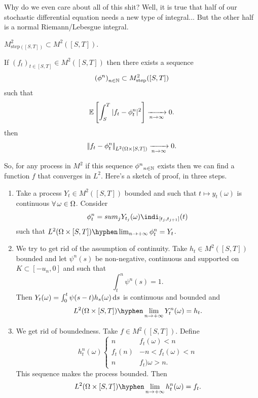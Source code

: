 \documentclass[crop=false, class=article]{standalone}
\begin{document}
Why do we even care about all of this shit? Well, it is true that half of our stochastic differential equation needs a new type of integral... But the other half is a normal Riemann/Lebesgue integral.
\begin{corollary}
	$M^{2}_{\mathrm{step}([S,T])}\subset M^{2}([S,T])$.
\end{corollary}
\begin{lemma}
	If ${(f_{t})}_{t\in[S,T]}\in M^{2}([S,T])$ then there exists a sequence
	\begin{equation*}
		{(\phi^{n})}_{n\in\mathbb{N}}\subset M^{2}_{\mathrm{step}}([S,T])
	\end{equation*}
	such that
	\begin{equation*}
		\mathbb{E}\left[\int_S^T|f_{t}-\phi^n_t|^2\right]\xrightarrow[n\to\infty]{}0.\textit{}
	\end{equation*}
	then
	\begin{equation*}
		\left|\negthinspace\left|f_t-\phi_t^{n}\right|\negthinspace\right|_{L^2(\Omega\times[S,T])}\xrightarrow[n\to\infty]{}0.
	\end{equation*}
\end{lemma}
So, for any process in $M^2$ if this sequence ${\phi^{n}}_{n\in\mathbb{N}}$ exists then we can find a function $f$ that converges in $L^2$. Here's a sketch of proof, in three steps.
\begin{fancyproof}
	\begin{enumerate}
		\item Take a process $Y_t\in M^2([S,T])$ bounded and such that $t\mapsto y_{t}(\omega)$ is continuous $\forall\, \omega\in\Omega$. Consider
		\begin{equation*}
			\phi_t^n=sum_jY_{t_{j}}(\omega)\indi_{[t_{j},t_{j+1}]}(t)
		\end{equation*}
		such that $L^2(\Omega\times[S,T])\hyphen\lim_{n \rightarrow +\infty}\phi^n_t=Y_t$.
		\item We try to get rid of the assumption of continuity. Take $h_t\in M^2([S,T])$ bounded and let $\psi^n(s)$ be non-negative, continuous and supported on $K\subset[-u_n,0]$ and such that
		\begin{equation*}
			\int_{t}^{n}\psi^n(s)=1.
		\end{equation*}
		Then $Y_t(\omega)=\int_0^t\psi(s-t)h_{s}(\omega)\mathop{}\!\mathrm{d} s$ is continuous and bounded and 
		\begin{equation*}
			L^2(\Omega\times[S,T])\hyphen\lim_{n \rightarrow +\infty} Y_t^n(\omega)=h_t.
		\end{equation*}
		\item We get rid of boundedness. Take $f\in M^2([S,T])$. Define
		\begin{equation*}h^{n}_{t}(\omega)
			\begin{cases}
				n &f_t(\omega)<n\\
				f_t(n)&-n<f_t(\omega)<n\\
				n&f_t)\omega>n.
			\end{cases}
		\end{equation*}
		This sequence makes the process bounded. Then
		\begin{equation*}
			L^2(\Omega\times[S,T])\hyphen\lim_{n \rightarrow +\infty}h^n_t(\omega)=f_t.
		\end{equation*}
	\end{enumerate}
\end{fancyproof}
\end{document}
